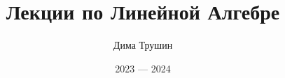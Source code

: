 \documentclass{article}
\begin{document}
\title{Лекции по Линейной Алгебре}
\author{Дима Трушин}
\date{2023 --- 2024}
	
\maketitle
\tableofcontents



























\end{document}
